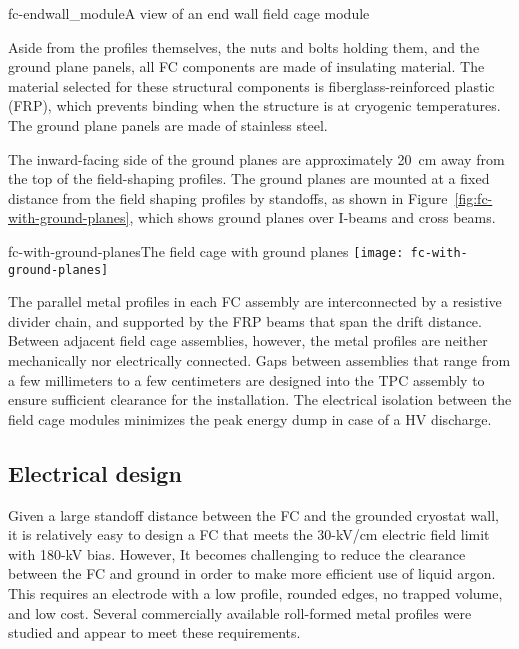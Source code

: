 \begin{cdrfigure}{fc-endwall_module}{A view of an end wall field cage module}
\end{cdrfigure}

Aside from the profiles themselves, the nuts and bolts holding them, and the ground plane panels, all FC components are made of insulating material. The material selected for these structural components is fiberglass-reinforced plastic (FRP), which prevents binding when the structure is at cryogenic temperatures. The ground plane panels are made of stainless steel. 

The inward-facing side of the ground planes are approximately 20~cm away from the top of the field-shaping profiles. The ground planes are mounted at a fixed distance from the field shaping profiles by standoffs, as shown in Figure~\ref{fig:fc-with-ground-planes}, which shows ground planes over I-beams and cross beams.

\begin{cdrfigure}{fc-with-ground-planes}{The field cage with ground planes}
\texttt{[image: fc-with-ground-planes]}
\end{cdrfigure}

The parallel metal profiles in each FC assembly 
 are interconnected by a resistive divider chain, and supported by the FRP beams that span the drift distance.  Between adjacent field cage assemblies, however,  
the metal profiles are neither mechanically nor electrically connected. Gaps between assemblies that range from a few millimeters to a few centimeters are designed into the TPC assembly to ensure sufficient clearance for the installation.  The electrical isolation between the field cage modules minimizes the peak energy dump in case of a HV discharge.


\subsection{Electrical design}

Given a large standoff distance between the FC and the grounded cryostat wall, it is relatively easy to design a FC that meets the 30-kV/cm electric field limit with 180-kV bias.  However, It becomes challenging to reduce the clearance between the FC and ground in order to make more efficient use of liquid argon.  This requires an electrode with a low profile, rounded edges, no trapped volume, and low cost.  Several commercially available roll-formed metal profiles were studied and appear to meet these requirements. 

